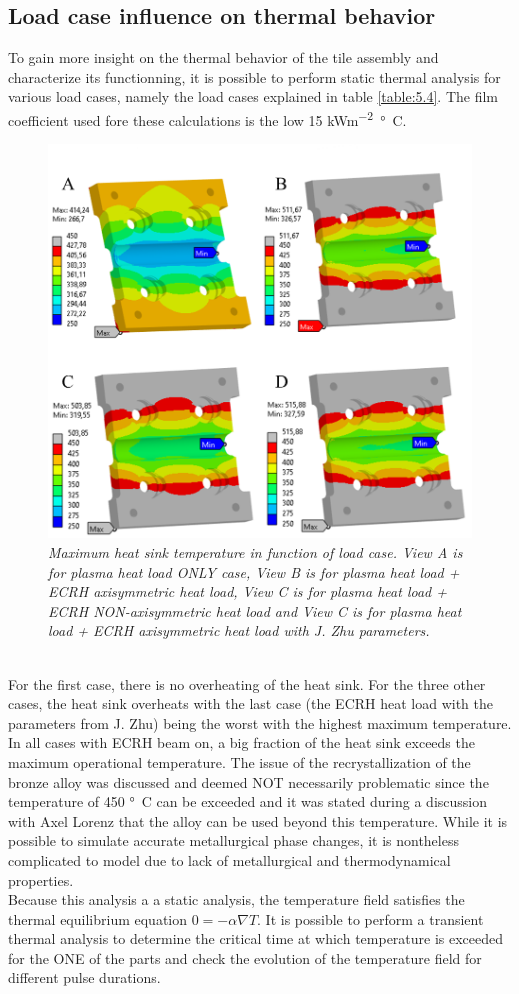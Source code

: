 \subsection{Load case influence on thermal behavior} \label{Load case influence on thermal behavior}
\normalsize{To gain more insight on the thermal behavior of the tile assembly and characterize its functionning, it is possible to perform static thermal analysis for various load cases, namely the load cases explained in table \ref{table:5.4}. The film coefficient used fore these calculations is the low 15 \unit{kWm^{-2}\si{\degree}C}. }
\\
\begin{figure}[h!]
    \label{fig_5_10} 
    \centering
    \includegraphics[width=.7\textwidth]{figures/loadcasestaticthermalHSTF.png}
    \caption{\it Maximum heat sink temperature in function of load case. View A is for plasma heat load ONLY case, View B is for plasma heat load + ECRH axisymmetric heat load, View C is for plasma heat load + ECRH NON-axisymmetric heat load  and View C is for plasma heat load + ECRH axisymmetric heat load with J. Zhu parameters.}
\end{figure}
\\
\normalsize{\indent For the first case, there is no overheating of the heat sink. For the three other cases, the heat sink overheats with the last case (the ECRH heat load with the parameters from J. Zhu) being the worst with the highest maximum temperature. In all cases with ECRH beam on, a big fraction of the heat sink exceeds the maximum operational temperature. The issue of the recrystallization of the bronze alloy was discussed and deemed NOT necessarily problematic since the temperature of 450 \unit{\si{\degree}C} can be exceeded and it was stated during a discussion with Axel Lorenz that the alloy can be used beyond this temperature. While it is possible to simulate accurate metallurgical phase changes, it is nontheless complicated to model due to lack of metallurgical and thermodynamical properties.}
\\
\break
\normalsize{\indent Because this analysis a a static analysis, the temperature field satisfies the thermal equilibrium equation $0=-\alpha \nabla T$. It is possible to perform a transient thermal analysis to determine the critical time at which temperature is exceeded for the ONE of the parts and check the evolution of the temperature field for different pulse durations.}